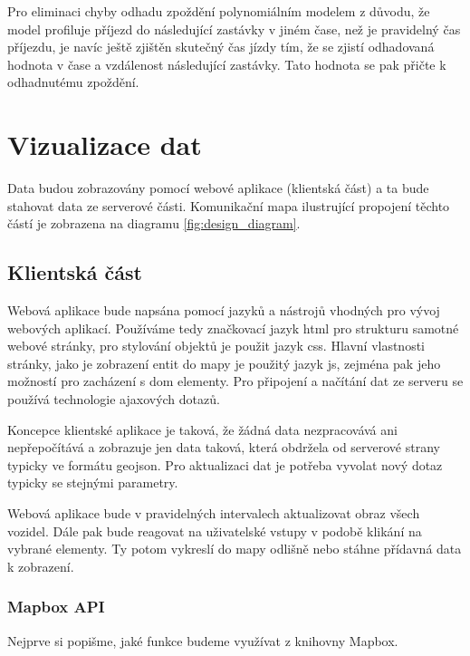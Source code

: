 \bigbreak


Pro eliminaci chyby odhadu zpoždění polynomiálním modelem z důvodu, že model profiluje příjezd do následující zastávky v jiném čase, než je pravidelný čas příjezdu, je navíc ještě zjištěn skutečný čas jízdy tím, že se zjistí odhadovaná hodnota v čase a vzdálenost následující zastávky. Tato hodnota se pak přičte k odhadnutému zpoždění.


\section{Vizualizace dat}


Data budou zobrazovány pomocí webové aplikace (klientská část) a ta bude stahovat data ze serverové části. Komunikační mapa ilustrující propojení těchto částí je zobrazena na diagramu \ref{fig:design_diagram}.


\subsection{Klientská část}


Webová aplikace bude napsána pomocí jazyků a nástrojů vhodných pro vývoj webových aplikací. Používáme tedy značkovací jazyk \gls{html} pro strukturu samotné webové stránky, pro stylování objektů je použit jazyk \gls{css}. Hlavní vlastnosti stránky, jako je zobrazení entit do mapy je použitý jazyk \gls{js}, zejména pak jeho možností pro zacházení s \gls{dom} elementy. Pro připojení a načítání dat ze serveru se používá technologie \gls{ajax}ových dotazů.


\bigbreak


Koncepce klientské aplikace je taková, že žádná data nezpracovává ani nepřepočítává a zobrazuje jen data taková, která obdržela od serverové strany typicky ve formátu \gls{geojson}. Pro aktualizaci dat je potřeba vyvolat nový dotaz typicky se stejnými parametry.


\bigbreak


Webová aplikace bude v pravidelných intervalech aktualizovat obraz všech vozidel. Dále pak bude reagovat na uživatelské vstupy v podobě klikání na vybrané elementy. Ty potom vykreslí do mapy odlišně nebo stáhne přídavná data k zobrazení.


\subsubsection{Mapbox API}


Nejprve si popišme, jaké funkce budeme využívat z knihovny Mapbox.


